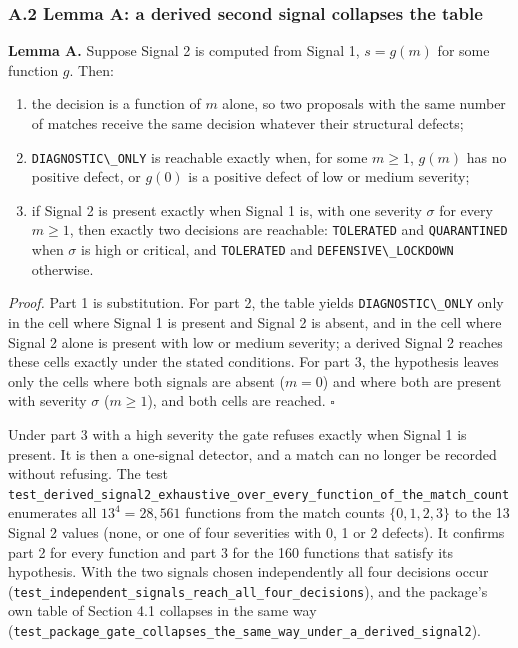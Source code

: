 \documentclass[
  11pt,
]{article}
\newcommand{\passthrough}[1]{#1}
\providecommand{\tightlist}{%
  \setlength{\itemsep}{0pt}\setlength{\parskip}{0pt}}
\begin{document}
\subsubsection{A.2 Lemma A: a derived second signal collapses the
table}\label{a.2-lemma-a-a-derived-second-signal-collapses-the-table}

\textbf{Lemma A.} Suppose Signal 2 is computed from Signal 1,
\(s = g(m)\) for some function \(g\). Then:

\begin{enumerate}
\def\labelenumi{\arabic{enumi}.}
\tightlist
\item
  the decision is a function of \(m\) alone, so two proposals with the
  same number of matches receive the same decision whatever their
  structural defects;
\item
  \passthrough{\lstinline!DIAGNOSTIC\_ONLY!} is reachable exactly when,
  for some \(m \geq 1\), \(g(m)\) has no positive defect, or \(g(0)\) is
  a positive defect of low or medium severity;
\item
  if Signal 2 is present exactly when Signal 1 is, with one severity
  \(\sigma\) for every \(m \geq 1\), then exactly two decisions are
  reachable: \passthrough{\lstinline!TOLERATED!} and
  \passthrough{\lstinline!QUARANTINED!} when \(\sigma\) is high or
  critical, and \passthrough{\lstinline!TOLERATED!} and
  \passthrough{\lstinline!DEFENSIVE\_LOCKDOWN!} otherwise.
\end{enumerate}

\emph{Proof.} Part 1 is substitution. For part 2, the table yields
\passthrough{\lstinline!DIAGNOSTIC\_ONLY!} only in the cell where Signal
1 is present and Signal 2 is absent, and in the cell where Signal 2
alone is present with low or medium severity; a derived Signal 2 reaches
these cells exactly under the stated conditions. For part 3, the
hypothesis leaves only the cells where both signals are absent
(\(m = 0\)) and where both are present with severity \(\sigma\)
(\(m \geq 1\)), and both cells are reached. \(\square\)

Under part 3 with a high severity the gate refuses exactly when Signal 1
is present. It is then a one-signal detector, and a match can no longer
be recorded without refusing. The test
\nolinkurl{test_derived_signal2_exhaustive_over_every_function_of_the_match_count}
enumerates all \(13^4 = 28{,}561\) functions from the match counts
\(\{0, 1, 2, 3\}\) to the 13 Signal 2 values (none, or one of four
severities with 0, 1 or 2 defects). It confirms part 2 for every
function and part 3 for the 160 functions that satisfy its hypothesis.
With the two signals chosen independently all four decisions occur
(\nolinkurl{test_independent_signals_reach_all_four_decisions}), and the
package's own table of Section 4.1 collapses in the same way
(\nolinkurl{test_package_gate_collapses_the_same_way_under_a_derived_signal2}).
\end{document}
